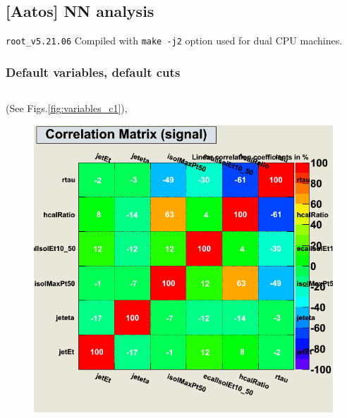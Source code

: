 \subsection{[Aatos] NN analysis}

{\tt root\_v5.21.06}
Compiled with {\tt make -j2} option used for dual CPU machines.

\subsubsection{Default variables, default cuts}
\scriptsize
\begin{verbatim}

\end{verbatim}
\normalsize

(See Figs.\ref{fig:variables_c1}),
 
\begin{figure}[h]
 \begin{minipage}{7.0cm}
\includegraphics[width=1.0\textwidth]{images/ahCorrelationMatrixS.png}
\end{minipage}
 \hfill
\begin{minipage}{7.0cm}

\end{minipage}
\end{figure}
